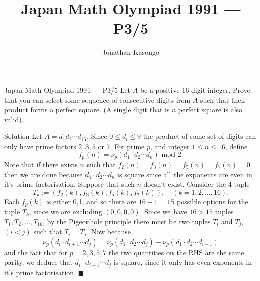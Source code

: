 \documentclass{article}
\author{Jonathan Kasongo}
\title{Japan Math Olympiad 1991 --- P3/5}
\begin{document}
\maketitle

\begin{problem}{Japan Math Olympiad 1991 --- P3/5}
Let \(A\) be a positive 16-digit integer. Prove that you can select
some sequence of consecutive digits from \(A\) such that their product
forms a perfect square. (A single digit that is a perfect square is
also valid).
\end{problem}

\begin{solution}{Solution}
Let $A = \overline{d_1 d_2 \cdots d_{16}}$. Since
$0 \leq d_i \leq 9$ the product of some set of digits can only have
prime factors $2,3,5$ or 7. For prime $p$, and integer $1 \leq n \leq 16$,
define
$$
f_p(n) = \nu_p (d_1 \cdot d_2 \cdots d_n) \text{ mod } 2.
$$
Note that if there exists $n$ such that
$f_2(n) = f_3(n) = f_5(n) = f_7(n) = 0$ then we are done because
$d_1 \cdot d_2 \cdots d_n$ is square since all the exponents are even in
it's prime factorisation. Suppose that such $n$ doesn't exist. Consider
the 4-tuple
$$
T_k := (f_2(k), f_3(k), f_5(k), f_7(k)), \quad (k=1,2,\ldots,16).
$$
Each $f_p(k)$ is either 0,1, and so there are $16 - 1 = 15$ possible options
for the tuple $T_k$, since we are excluding $(0,0,0,0)$. Since we have
$16 > 15$ tuples $T_1, T_2, \ldots, T_{16}$, by the Pigeonhole principle
there must be two tuples $T_i$ and $T_j$, $(i < j)$ such that
$T_i = T_j$. Now because
$$
\nu_p(d_i \cdot d_{i+1} \cdots d_j) = \nu_p(d_1 \cdot d_2 \cdots d_j) -
\nu_p(d_1 \cdot d_2 \cdots d_{i-1})
$$
and the fact that for $p=2,3,5,7$ the two quantities on the RHS are the same
parity, we deduce that $d_i \cdot d_{i+1}\cdots d_j$ is square, since it
only has even exponents in it's prime factorisation. $\blacksquare$
\end{solution}
\end{document}

